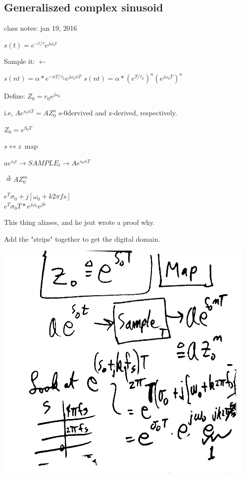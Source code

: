 \subsection*{Generaliszed complex sinusoid}
class notes: jan 19, 2016

$s(t) = e^{-t/\tau}e^{j\omega_0 t}$


Sample it: $ \leftarrow$

$s(nt) = \alpha * e ^{-nT/\tau_0}e^{j\omega_0 n T}$
$s(nt) = \alpha * (e ^{T/\tau_0})^n(e^{j\omega_0T})^n$


Define: $Z_0 = r_0 e^{j\omega_0}$

i.e, $Ae^{s_0 n T} = AZ_0^n$ s-0dervived and z-derived, respectively.

$Z_0 = e^{S_0 T}$  

\mbox{$s \leftrightarrow z$ map}

$a e^{s_0 t} \rightarrow SAMPLE_t \rightarrow Ae^{s_0 n T}$

$\stackrel{\Delta}{=} A Z_0^m$

$e^T{\sigma_0 + j[\omega_0 + k2\pi fs ]}$\\
$e^T{\sigma_0 T} * e^{j\omega_0}e^{jk}$ 

This thing aliases, and he jsut wrote a proof why. 

Add the "strips" together to get the digital domain.



\includegraphics[scale=0.5]{photos/jan17/9a}



